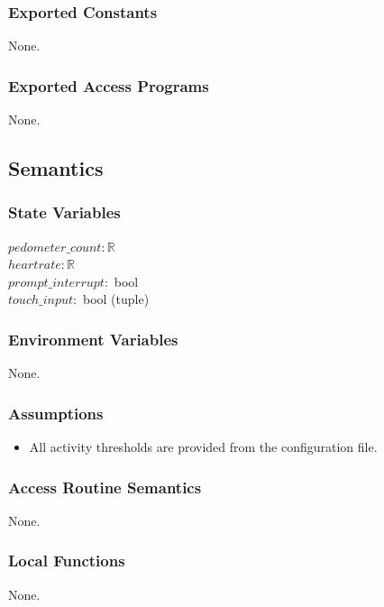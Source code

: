 \documentclass[12pt, titlepage]{article}
\begin{document}
\subsubsection{Exported Constants}

None.

\subsubsection{Exported Access Programs}

None.

\subsection{Semantics}

\subsubsection{State Variables}

$pedometer\_count: \mathbb{R}$ \\
$heartrate: \mathbb{R}$ \\
$prompt\_interrupt:$ bool \\
$touch\_input:$ bool (tuple) 
\subsubsection{Environment Variables}

None.

\subsubsection{Assumptions}
\begin{itemize}
\item All activity thresholds are provided from the configuration file.
\end{itemize}

\subsubsection{Access Routine Semantics}

None.

\subsubsection{Local Functions}
None.
\end{document}
